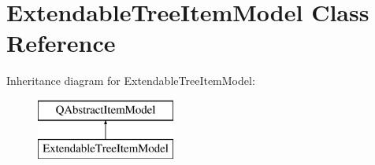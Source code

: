 \hypertarget{class_extendable_tree_item_model}{}\section{Extendable\+Tree\+Item\+Model Class Reference}
\label{class_extendable_tree_item_model}
Inheritance diagram for Extendable\+Tree\+Item\+Model\+:\begin{figure}[H]
\begin{center}
\leavevmode
\includegraphics[height=2.000000cm]{class_extendable_tree_item_model}
\end{center}
\end{figure}
